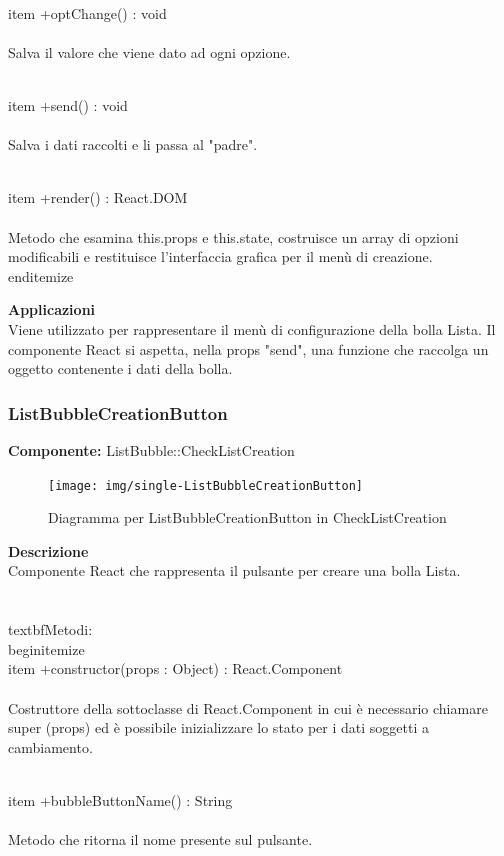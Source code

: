 \\item +optChange() : void 
\\\\
Salva il valore che viene dato ad ogni opzione.

\\item +send() : void 
\\\\
Salva i dati raccolti e li passa al "padre".

\\item +render() : React.DOM
\\\\
Metodo che esamina this.props e this.state, costruisce un array di opzioni modificabili e restituisce l'interfaccia grafica per il menù di creazione.
\\end{itemize} 


\textbf{Applicazioni}\\
Viene utilizzato per rappresentare il menù di configurazione della bolla Lista. Il componente React si aspetta, nella props "send", una funzione che raccolga un oggetto contenente i dati della bolla. 


\clearpage

\subsubsection{ListBubbleCreationButton}
\textbf{Componente:}  ListBubble::CheckListCreation\\
   \FloatBarrier
   \begin{figure}[ht]
   \centering
   \texttt{[image: img/single-ListBubbleCreationButton]}
   \caption{{Diagramma per ListBubbleCreationButton in CheckListCreation}}
\end{figure}
\FloatBarrier
\textbf{Descrizione}\\
Componente React che rappresenta il pulsante per creare una bolla Lista.
\\\\
\\textbf{Metodi:} 
\\begin{itemize}
\\item +constructor(props : Object) : React.Component 
\\\\
Costruttore della sottoclasse di React.Component in cui è necessario chiamare super (props) ed è possibile inizializzare lo stato per i dati soggetti a cambiamento.

\\item +bubbleButtonName() : String 
\\\\
Metodo che ritorna il nome presente sul pulsante.

